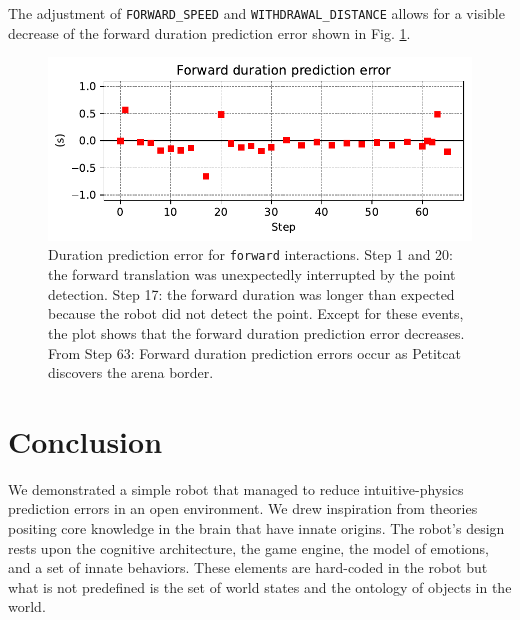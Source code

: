 \documentclass[runningheads]{llncs}
\begin{document}
The adjustment of \texttt{FORWARD\_SPEED} and \texttt{WITHDRAWAL\_DIS\-TANCE} allows for a visible decrease of the forward duration prediction error shown in Fig. \ref{fig:forward_re}.

\begin{figure}
	\includegraphics[width=\textwidth]{07_Forward_duration_pe.pdf}
	\caption{Duration prediction error for \texttt{forward} interactions.
	Step 1 and 20: the forward translation was unexpectedly interrupted by the point detection.
	Step 17: the forward duration was longer than expected because the robot did not detect the point.
	Except for these events, the plot shows that the forward duration prediction error decreases.
	From Step 63: Forward duration prediction errors occur as Petitcat discovers the arena border.
	} \label{fig:forward_re}
\end{figure}


\section{Conclusion}

We demonstrated a simple robot that managed to reduce intuitive-physics prediction errors in an open environment. 
We drew inspiration from theories positing core knowledge in the brain that have innate origins.
The robot's design rests upon the cognitive architecture, the game engine, the model of emotions, and a set of innate behaviors.
These elements are hard-coded in the robot but what is not predefined is the set of world states and the ontology of objects in the world.
\end{document}
